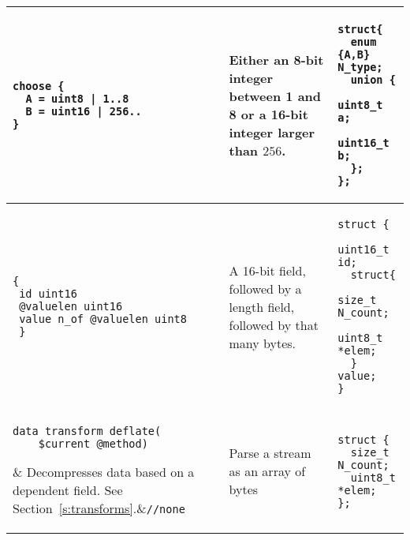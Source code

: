 \begin{figure*}[thb]
\begin{tabular}{@{}p{5cm}p{6cm}p{5cm}@{}}
\begin{minipage}{5cm}
\begin{verbatim}
choose {
  A = uint8 | 1..8
  B = uint16 | 256..
}
\end{verbatim}
\end{minipage}
&\begin{minipage}{6cm} Either an 8-bit integer between 1 and 8 or a 16-bit integer larger than $256$.
  \end{minipage}&
\begin{minipage}{5cm}
\begin{lstlisting}
struct{
  enum {A,B} N_type;
  union {
    uint8_t a;
    uint16_t b;
  };
};
\end{lstlisting}
\end{minipage}\\\hline

\begin{minipage}{5cm}
\begin{verbatim}
{ 
 id uint16
 @valuelen uint16
 value n_of @valuelen uint8
 }
\end{verbatim}
\end{minipage}
&
\begin{minipage}{6cm}
A 16-bit field, followed by a length field, followed by that many bytes.
\end{minipage}
&
\begin{minipage}{5cm}
\begin{lstlisting}
struct {
  uint16_t id;
  struct{ 
    size_t N_count;
    uint8_t *elem;
  } value;
}
\end{lstlisting}
\end{minipage}
\\\hline
\begin{minipage}{5cm}
\vspace{0.5em}
\begin{verbatim}
data transform deflate(
    $current @method)
\end{verbatim}
\end{minipage}
&
Decompresses data based on a dependent field. See
Section~\ref{s:transforms}.&\lstinline+//none+ \\\hline
\verb+apply $stream many uint8_t+ & Parse a stream as an array of bytes & 
\begin{minipage}{5cm}
\begin{lstlisting}
struct {
  size_t N_count;
  uint8_t *elem;
};
\end{lstlisting}
\end{minipage} \\
\bottomrule
\end{tabular}
\caption{Syntax of Nail parser declarations and the formats and data types they describe.}
\label{fig:syntax}
\end{figure*}